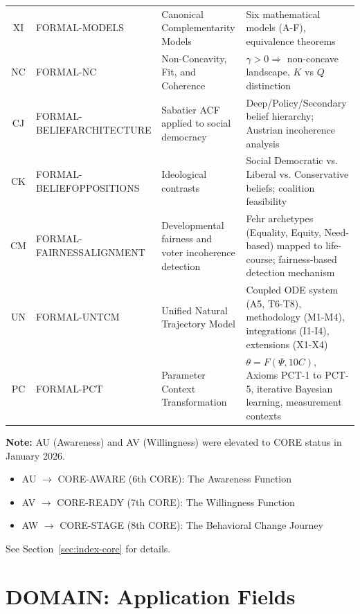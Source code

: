 \begin{table}[htbp]
\begin{tabular}{@{}clll@{}}
XI & FORMAL-MODELS & Canonical Complementarity Models & Six mathematical models (A-F), equivalence theorems \\
NC & FORMAL-NC & Non-Concavity, Fit, and Coherence & $\gamma > 0 \Rightarrow$ non-concave landscape, $K$ vs $Q$ distinction \\
CJ & FORMAL-BELIEFARCHITECTURE & Sabatier ACF applied to social democracy & Deep/Policy/Secondary belief hierarchy; Austrian incoherence analysis \\
CK & FORMAL-BELIEFOPPOSITIONS & Ideological contrasts & Social Democratic vs. Liberal vs. Conservative beliefs; coalition feasibility \\
CM & FORMAL-FAIRNESSALIGNMENT & Developmental fairness and voter incoherence detection & Fehr archetypes (Equality, Equity, Need-based) mapped to life-course; fairness-based detection mechanism \\
UN & FORMAL-UNTCM & Unified Natural Trajectory Model & Coupled ODE system (A5, T6-T8), methodology (M1-M4), integrations (I1-I4), extensions (X1-X4) \\
PC & FORMAL-PCT & Parameter Context Transformation & $\theta = F(\Psi, 10C)$, Axioms PCT-1 to PCT-5, iterative Bayesian learning, measurement contexts \\
\bottomrule
\end{tabular}
\end{table}

\begin{tcolorbox}[colback=yellow!5!white, colframe=yellow!75!black]
\textbf{Note:} AU (Awareness) and AV (Willingness) were elevated to CORE status in January 2026.
\begin{itemize}[nosep]
    \item AU $\to$ CORE-AWARE (6th CORE): The Awareness Function
    \item AV $\to$ CORE-READY (7th CORE): The Willingness Function
    \item AW $\to$ CORE-STAGE (8th CORE): The Behavioral Change Journey
\end{itemize}
See Section~\ref{sec:index-core} for details.
\end{tcolorbox}

\section{DOMAIN: Application Fields}
\label{sec:index-domain}

